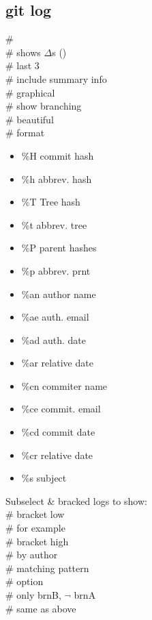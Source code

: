 \subsection*{git log}
 \# \\
 \# shows $\Delta$\textquotesingle s ()\\
 \# last 3 \\
 \# include summary info \\
 \# graphical \\
 \# show branching \\
 \# beautiful \\
 \# format
\begin{multicols}{2}[]
\scriptsize
\begin{itemize}[topsep=0mm]
    \item \%H commit hash
    \item \%h abbrev. hash
    \item \%T Tree hash
    \item \%t abbrev. tree
    \item \%P parent hashes
    \item \%p abbrev. prnt
    \item \%an author name
    \item \%ae auth. email
    \item \%ad auth. date
    \item \%ar relative date
    \item \%cn commiter name
    \item \%ce commit. email
    \item \%cd commit date
    \item \%cr relative date
    \item \%s subject
\end{itemize}
\end{multicols}
Subselect \& bracked logs to show:\\
 \# bracket low \\
 \# for example \\
 \# bracket high \\
 \# by author \\
 \# matching pattern \\
 \#  option \\
 \# only brnB, $\neg$ brnA \\
 \# same as above


